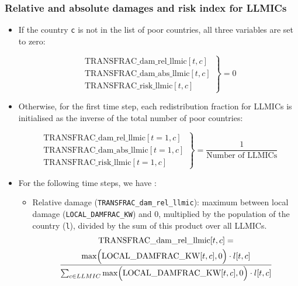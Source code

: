\documentclass[
]{article}
\providecommand{\tightlist}{%
  \setlength{\itemsep}{0pt}\setlength{\parskip}{0pt}}
\begin{document}
\subsubsection{Relative and absolute damages and risk index for
LLMICs}\label{relative-and-absolute-damages-and-risk-index-for-llmics}

\begin{itemize}
  \item If the country \texttt{c} is not in the list of poor countries, all three
  variables are set to zero:

  \begin{equation}
    \left. \begin{array}{l}
    \text{TRANSFRAC\_dam\_rel\_llmic}[t,c] \\
    \text{TRANSFRAC\_dam\_abs\_llmic}[t,c] \\
    \text{TRANSFRAC\_risk\_llmic}[t,c]
    \end{array} \right\}
    = 0
    \end{equation}

\item Otherwise, for the first time step, each redistribution fraction for
LLMICs is initialised as the inverse of the total number of poor
countries:

\begin{equation}
\left. \begin{array}{l}
\text{TRANSFRAC\_dam\_rel\_llmic}[t = 1,c] \\
\text{TRANSFRAC\_dam\_abs\_llmic}[t = 1,c] \\
\text{TRANSFRAC\_risk\_llmic}[t = 1,c]
\end{array} \right\}
= \frac{1}{\text{Number of LLMICs}}
\end{equation}

\item For the following time steps, we have :

\begin{itemize}
\tightlist
\item
  Relative damage (\texttt{TRANSFRAC\_dam\_rel\_llmic}): maximum between
  local damage (\texttt{LOCAL\_DAMFRAC\_KW}) and 0, multiplied by the
  population of the country (\texttt{l}), divided by the sum of this
  product over all LLMICs.
\begin{multline}
\text{TRANSFRAC\_dam\_rel\_llmic}[t,c] = \\
\frac{\max \Bigl(\text{LOCAL\_DAMFRAC\_KW}[t,c], 0 \Bigr) \cdot l[t,c]}{\sum_{c \in LLMIC} \max \Bigl(\text{LOCAL\_DAMFRAC\_KW}[t,c], 0 \Bigr) \cdot l[t,c] }
\end{multline}



\end{itemize}
\end{itemize}
\end{document}
